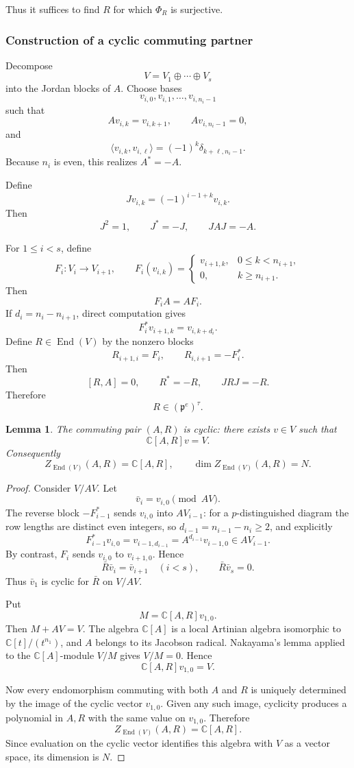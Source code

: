 \documentclass[11pt,reqno]{amsart}
\numberwithin{equation}{section}
\newtheorem{lemma}[theorem]{Lemma}
\theoremstyle{definition}
\theoremstyle{remark}
\newcommand{\C}{\mathbb C}
\newcommand{\End}{\operatorname{End}}
\begin{document}
Thus it suffices to find \(R\) for which \(\Phi_R\) is surjective.

\subsubsection{Construction of a cyclic commuting partner}

Decompose
\[
V=V_1\oplus\cdots\oplus V_s
\]
into the Jordan blocks of \(A\).  Choose bases
\[
v_{i,0},v_{i,1},\ldots,v_{i,n_i-1}
\]
such that
\[
Av_{i,k}=v_{i,k+1},
\qquad
Av_{i,n_i-1}=0,
\]
and
\[
\langle v_{i,k},v_{i,\ell}\rangle
=
(-1)^k\delta_{k+\ell,n_i-1}.
\]
Because \(n_i\) is even, this realizes \(A^*=-A\).

Define
\[
Jv_{i,k}=(-1)^{i-1+k}v_{i,k}.
\]
Then
\[
J^2=1,\qquad
J^*=-J,\qquad
JAJ=-A.
\]

For \(1\leq i<s\), define
\[
F_i:V_i\to V_{i+1},
\qquad
F_i(v_{i,k})=
\begin{cases}
v_{i+1,k},&0\leq k<n_{i+1},\\
0,&k\geq n_{i+1}.
\end{cases}
\]
Then
\[
F_iA=AF_i.
\]
If \(d_i=n_i-n_{i+1}\), direct computation gives
\[
F_i^*v_{i+1,k}=v_{i,k+d_i}.
\]
Define \(R\in\End(V)\) by the nonzero blocks
\[
R_{i+1,i}=F_i,
\qquad
R_{i,i+1}=-F_i^*.
\]
Then
\[
[R,A]=0,\qquad
R^*=-R,\qquad
JRJ=-R.
\]
Therefore
\[
R\in(\mathfrak p^e)^\tau.
\]

\begin{lemma}\label{cii:lem:cyclic}
The commuting pair \((A,R)\) is cyclic: there exists \(v\in V\) such that
\[
\C[A,R]v=V.
\]
Consequently
\[
Z_{\End(V)}(A,R)=\C[A,R],
\qquad
\dim Z_{\End(V)}(A,R)=N.
\]
\end{lemma}

\begin{proof}
Consider \(V/AV\).  Let
\[
\bar v_i=v_{i,0}\pmod{AV}.
\]
The reverse block \(-F_{i-1}^*\) sends \(v_{i,0}\) into \(AV_{i-1}\):
for a $p$-distinguished diagram the row lengths are distinct even integers, so
\(d_{i-1}=n_{i-1}-n_i\ge2\), and explicitly
\[
 F_{i-1}^*v_{i,0}=v_{i-1,d_{i-1}}
   =A^{d_{i-1}}v_{i-1,0}\in AV_{i-1}.
\]
By contrast, \(F_i\) sends \(v_{i,0}\) to \(v_{i+1,0}\).  Hence
\[
\bar R\bar v_i=\bar v_{i+1}\quad(i<s),
\qquad
\bar R\bar v_s=0.
\]
Thus \(\bar v_1\) is cyclic for \(\bar R\) on \(V/AV\).

Put
\[
M=\C[A,R]v_{1,0}.
\]
Then \(M+AV=V\).  The algebra \(\C[A]\) is a local Artinian algebra
isomorphic to \(\C[t]/(t^{n_1})\), and \(A\) belongs to its Jacobson
radical.  Nakayama's lemma applied to the \(\C[A]\)-module \(V/M\)
gives \(V/M=0\).  Hence
\[
\C[A,R]v_{1,0}=V.
\]

Now every endomorphism commuting with both \(A\) and \(R\) is uniquely
determined by the image of the cyclic vector \(v_{1,0}\).  Given any such
image, cyclicity produces a polynomial in \(A,R\) with the same value on
\(v_{1,0}\).  Therefore
\[
Z_{\End(V)}(A,R)=\C[A,R].
\]
Since evaluation on the cyclic vector identifies this algebra with \(V\)
as a vector space, its dimension is \(N\).
\end{proof}
\end{document}
